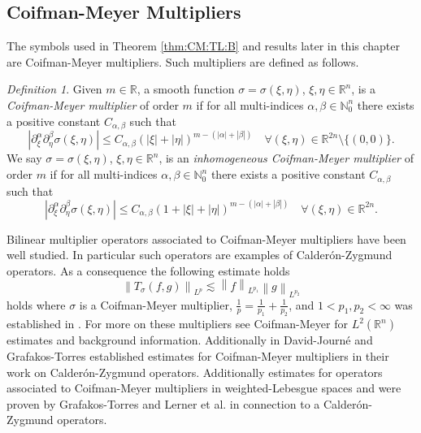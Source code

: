 \documentclass[10pt,a4paper]{article}
\theoremstyle{remark}
\newtheorem{dfn}{Definition}[section]
\newcommand{\re}{\mathbb{R}}
\newcommand{\rn}{{{\mathbb R}^n}}
\newcommand{\abs}[1]{\left\vert #1 \right\vert}
\newcommand{\norm}[2]{\left\|#1\right\|_{#2}}
\begin{document}
\subsection{Coifman-Meyer Multipliers}\label{Coifman-Meyer Multipliers}

The symbols used in Theorem \ref{thm:CM:TL:B} and results later in this chapter are Coifman-Meyer multipliers. Such multipliers are defined as follows.

\begin{dfn}\label{CM_def}
Given $m\in\mathbb{R}$, a smooth function $\sigma = \sigma(\xi,\eta)$, $\xi,\eta\in\rn$, is a \textit{Coifman-Meyer multiplier} of order $m$ if for all multi-indices $\alpha,\beta\in\mathbb{N}^n_0$ there exists a positive constant $C_{\alpha,\beta}$ such that 
\begin{equation}\label{eq:CMm}
|\partial_\xi^\alpha \partial_\eta^\beta \sigma(\xi, \eta)| \leq C_{\alpha, \beta} (|\xi|+|\eta|)^{m -(\abs{\alpha}+ \abs{\beta})} \quad \forall (\xi, \eta) \in \re^{2n} \setminus \{(0,0)\}.
\end{equation}
We say $\sigma = \sigma(\xi,\eta)$, $\xi,\eta\in\rn$, is an \textit{inhomogeneous Coifman-Meyer multiplier} of order $m$ if for all multi-indices $\alpha,\beta\in\mathbb{N}^n_0$ there exists a positive constant $C_{\alpha,\beta}$ such that 
\begin{equation}\label{eq:CMm}
|\partial_\xi^\alpha \partial_\eta^\beta \sigma(\xi, \eta)| \leq C_{\alpha, \beta} (1+|\xi|+|\eta|)^{m -(\abs{\alpha}+ \abs{\beta})} \quad \forall (\xi, \eta) \in \re^{2n}.
\end{equation}
\end{dfn}
Bilinear multiplier operators associated to Coifman-Meyer multipliers have been well studied. In particular such operators are examples of Calder\'on-Zygmund operators. As a consequence the following estimate holds 
\[ \norm{T_\sigma(f,g)}{L^p}\lesssim \norm{f}{L^{p_1}}\norm{g}{L^{p_2}} \]
holds where $\sigma$ is a Coifman-Meyer multiplier, $\frac{1}{p} = \frac{1}{p_1} + \frac{1}{p_2}$, and $1<p_1,p_2<\infty$ was established in \cite{MR1880324}. For more on these multipliers see Coifman-Meyer \cite{MR518170} for $L^2(\rn)$ estimates and background information. Additionally in David-Journ\'{e} \cite{MR763911} and Grafakos-Torres \cite{MR1880324} established estimates for Coifman-Meyer multipliers in their work on Calder\'on-Zygmund operators. Additionally estimates for operators associated to Coifman-Meyer multipliers in weighted-Lebesgue spaces and were proven by Grafakos-Torres \cite{MR1947875} and Lerner et al. \cite{MR2483720} in connection to a Calder\'{o}n-Zygmund operators. 	
\end{document}

